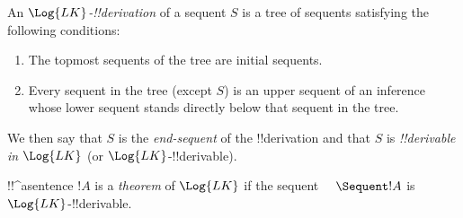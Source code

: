 \documentclass[../../../include/open-logic-section]{subfiles}
\begin{document}
\begin{defn}[LK !!{derivation}]
An \emph{$\Log{LK}$-!!{derivation}} of a sequent $S$ is a tree of sequents
satisfying the following conditions:
\begin{enumerate}
\item The topmost sequents of the tree are initial sequents.
\item Every sequent in the tree (except $S$) is an upper sequent of an
  inference whose lower sequent stands directly below that sequent in
  the tree.
\end{enumerate}
We then say that $S$ is the \emph{end-sequent} of the !!{derivation} and
that $S$ is \emph{!!{derivable} in $\Log{LK}$} (or $\Log{LK}$-!!{derivable}).
\end{defn}

\begin{defn}[LK theorem]
!!^a{sentence} $!A$ is a \emph{theorem} of $\Log{LK}$ if the sequent
$\quad \Sequent !A$ is $\Log{LK}$-!!{derivable}.
\end{defn}
\end{document}
